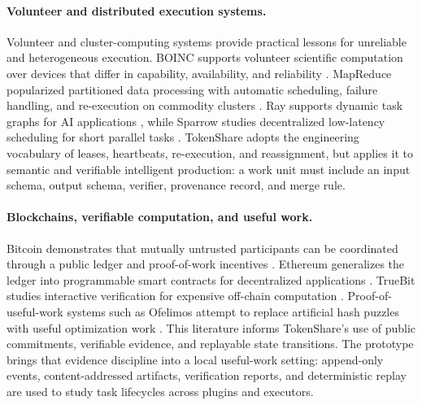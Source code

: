 \documentclass{article}
\theoremstyle{plain}
\begin{document}
\paragraph{Volunteer and distributed execution systems.}
{\color{blue}
Volunteer and cluster-computing systems provide practical lessons for unreliable and heterogeneous execution. BOINC supports volunteer scientific computation over devices that differ in capability, availability, and reliability \citep{anderson2020boinc}. MapReduce popularized partitioned data processing with automatic scheduling, failure handling, and re-execution on commodity clusters \citep{dean2004mapreduce}. Ray supports dynamic task graphs for AI applications \citep{moritz2018ray}, while Sparrow studies decentralized low-latency scheduling for short parallel tasks \citep{ousterhout2013sparrow}. TokenShare adopts the engineering vocabulary of leases, heartbeats, re-execution, and reassignment, but applies it to semantic and verifiable intelligent production: a work unit must include an input schema, output schema, verifier, provenance record, and merge rule.
}

\paragraph{Blockchains, verifiable computation, and useful work.}
{\color{blue}
Bitcoin demonstrates that mutually untrusted participants can be coordinated through a public ledger and proof-of-work incentives \citep{nakamoto2008bitcoin}. Ethereum generalizes the ledger into programmable smart contracts for decentralized applications \citep{buterin2014ethereum}. TrueBit studies interactive verification for expensive off-chain computation \citep{teutsch2019truebit}. Proof-of-useful-work systems such as Ofelimos attempt to replace artificial hash puzzles with useful optimization work \citep{fitzi2022ofelimos}. This literature informs TokenShare's use of public commitments, verifiable evidence, and replayable state transitions. The prototype brings that evidence discipline into a local useful-work setting: append-only events, content-addressed artifacts, verification reports, and deterministic replay are used to study task lifecycles across plugins and executors.
}
\end{document}
